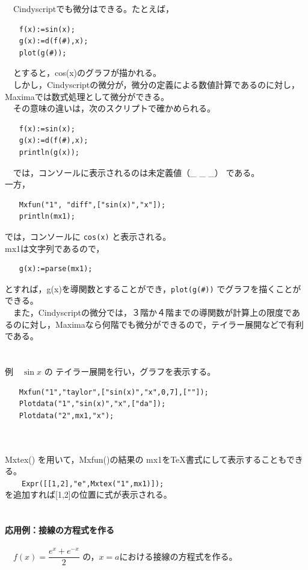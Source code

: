 \documentclass[papersize,a4paper,12pt,uplatex]{jsarticle}
\begin{document}
\begin{description}
　Cindyscriptでも微分はできる。たとえば，
\begin{verbatim}
　　f(x):=sin(x);
　　g(x):=d(f(#),x);
　　plot(g(#));
\end{verbatim}
　とすると，cos(x)のグラフが描かれる。\\
　しかし，Cindyscriptの微分が，微分の定義による数値計算であるのに対し，Maximaでは数式処理として微分ができる。\\
　その意味の違いは，次のスクリプトで確かめられる。
\begin{verbatim}
　　f(x):=sin(x);
　　g(x):=d(f(#),x);
　　println(g(x));
\end{verbatim}
　では，コンソールに表示されるのは未定義値（\_ \_ \_） である。\\
一方，
\begin{verbatim}
　　Mxfun("1", "diff",["sin(x)","x"]);
　　println(mx1);
\end{verbatim}
では，コンソールに \verb|cos(x)| と表示される。\\
mx1は文字列であるので，
\begin{verbatim}
　　g(x):=parse(mx1);
\end{verbatim}
とすれば，g(x)を導関数とすることができ，\verb|plot(g(#))| でグラフを描くことができる。\\
　また，Cindyscriptの微分では，３階か４階までの導関数が計算上の限度であるのに対し，Maximaなら何階でも微分ができるので，テイラー展開などで有利である。\\
　\\
　\\
例　$\sin x$ の テイラー展開を行い，グラフを表示する。
\begin{verbatim}
　　Mxfun("1","taylor",["sin(x)","x",0,7],[""]);
　　Plotdata("1","sin(x)","x",["da"]);
　　Plotdata("2",mx1,"x");
\end{verbatim}
　\\
　　　　
　\\
Mxtex() を用いて，Mxfun()の結果の mx1をTeX書式にして表示することもできる。\\
　　\verb|Expr([[1,2],"e",Mxtex("1",mx1)]);|\\
を追加すれば[1,2]の位置に式が表示される。\\
　\\
　\\
{\bf 応用例：接線の方程式を作る}\\
　\\
　$f(x)=\dfrac{e^x+e^{-x}}{2}$ の，$x=a$における接線の方程式を作る。\\

\end{description}
\end{document}
